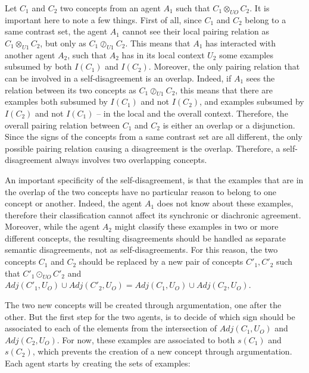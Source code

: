 Let $C_{1}$ and $C_{2}$ two concepts from an agent $A_{1}$ such that $C_{1} \otimes_{UO} C_{2}$. It is important here to note a few things. First of all, since $C_{1}$ and $C_{2}$ belong to a same contrast set, the agent $A_{1}$ cannot see their local pairing relation as $C_{1} \otimes_{U1} C_{2}$, but only as $C_{1} \oslash_{U1} C_{2}$. This means that $A_{1}$ has interacted with another agent $A_{2}$, such that $A_{2}$ has in its local context $U_{2}$ some examples subsumed by both $I(C_{1})$ and $I(C_{2})$.
Moreover, the only pairing relation that can be involved in a self-disagreement is an overlap. Indeed, if $A_{1}$ sees the relation between its two concepts as $C_{1} \oslash_{U1} C_{2}$, this means that there are examples both subsumed by $I(C_{1})$ and not $I(C_{2})$, and examples subsumed by $I(C_{2})$ and not $I(C_{1})$ -- in the local and the overall context. Therefore, the overall pairing relation between $C_{1}$ and $C_{2}$ is either an overlap or a disjunction. Since the signs of the concepts from a same contrast set are all different, the only possible pairing relation causing a disagreement is the overlap. Therefore, a self-disagreement always involves two overlapping concepts.

An important specificity of the self-disagreement, is that the examples that are in the overlap of the two concepts have no particular reason to belong to one concept or another. Indeed, the agent $A_{1}$ does not know about these examples, therefore their classification cannot affect its synchronic or diachronic agreement. Moreover, while the agent $A_{2}$ might classify these examples in two or more different concepts, the resulting disagreements should be handled as separate semantic disagreements, not as self-disagreements. For this reason, the two concepts $C_{1}$ and $C_{2}$ should be replaced by a new pair of concepts $C'_{1}, C'_{2}$ such that $C'_{1} \odot_{UO} C'_{2}$ and $Adj(C'_{1},U_{O}) \cup Adj(C'_{2},U_{O}) = Adj(C_{1},U_{O}) \cup Adj(C_{2},U_{O})$.

The two new concepts will be created through argumentation, one after the other. But the first step for the two agents, is to decide of which sign should be associated to each of the elements from the intersection of $Adj(C_{1},U_{O})$ and $Adj(C_{2},U_{O})$. For now, these examples are associated to both $s(C_{1})$ and $s(C_{2})$, which prevents the creation of a new concept through argumentation. Each agent starts by creating the sets of examples:

